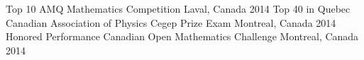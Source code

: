 \begin{cvhonors}
  \cvhonor
    {Top 10}
    {AMQ Mathematics Competition}
    {Laval, Canada}
    {2014}
  \cvhonor
    {Top 40 in Quebec}
    {Canadian Association of Physics Cegep Prize Exam}
    {Montreal, Canada}
    {2014}
  \cvhonor
    {Honored Performance}
    {Canadian Open Mathematics Challenge}
    {Montreal, Canada}
    {2014}

\end{cvhonors}

